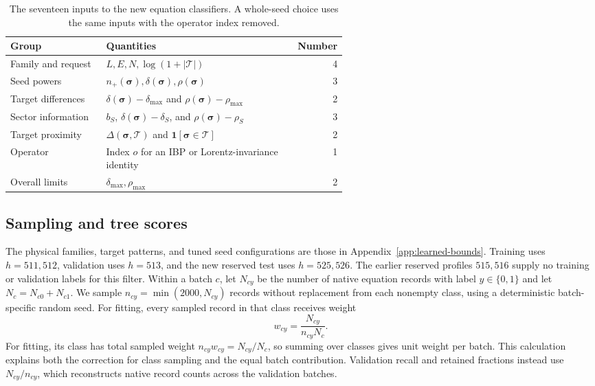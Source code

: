 \begin{table}[!htbp]\centering\small
\caption{The seventeen inputs to the new equation classifiers. A whole-seed choice uses the same inputs with the operator index removed.}
\label{tab:refinement-features}
\begin{tabular}{@{}lp{0.57\linewidth}r@{}}\toprule
Group & Quantities & Number\\\midrule
Family and request & $L,E,N,\log(1+|\mathcal T|)$ & 4\\
Seed powers & $n_+(\boldsymbol\sigma),\delta(\boldsymbol\sigma),\rho(\boldsymbol\sigma)$ & 3\\
Target differences & $\delta(\boldsymbol\sigma)-\delta_{\max}$ and $\rho(\boldsymbol\sigma)-\rho_{\max}$ & 2\\
Sector information & $b_S$, $\delta(\boldsymbol\sigma)-\delta_S$, and $\rho(\boldsymbol\sigma)-\rho_S$ & 3\\
Target proximity & $\Delta(\boldsymbol\sigma,\mathcal T)$ and $\mathbf 1[\boldsymbol\sigma\in\mathcal T]$ & 2\\
Operator & Index $o$ for an IBP or Lorentz-invariance identity & 1\\
Overall limits & $\delta_{\max},\rho_{\max}$ & 2\\\bottomrule
\end{tabular}
\end{table}

\subsection{Sampling and tree scores}
The physical families, target patterns, and tuned seed configurations are those in Appendix~\ref{app:learned-bounds}. Training uses $h=511,512$, validation uses $h=513$, and the new reserved test uses $h=525,526$. The earlier reserved profiles $515,516$ supply no training or validation labels for this filter. Within a batch $c$, let $N_{cy}$ be the number of native equation records with label $y\in\{0,1\}$ and let $N_c=N_{c0}+N_{c1}$. We sample $n_{cy}=\min(2000,N_{cy})$ records without replacement from each nonempty class, using a deterministic batch-specific random seed. For fitting, every sampled record in that class receives weight
\begin{equation}
 w_{cy}=\frac{N_{cy}}{n_{cy}N_c}.
\label{eq:refinement-weight}
\end{equation}
For fitting, its class has total sampled weight $n_{cy}w_{cy}=N_{cy}/N_c$, so summing over classes gives unit weight per batch. This calculation explains both the correction for class sampling and the equal batch contribution. Validation recall and retained fractions instead use $N_{cy}/n_{cy}$, which reconstructs native record counts across the validation batches.

